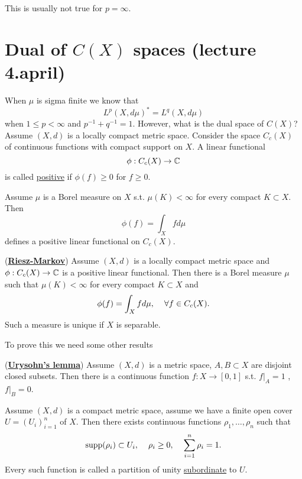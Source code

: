 \begin{remark}
    This is usually not true for $p=\infty$.
\end{remark}

\section*{Dual of $C(X)$ spaces (lecture 4.april)}
When $\mu$ is sigma finite we know that \[L^p(X,d\mu)^* = L^q(X,d\mu)\]
when $1\leq p<\infty$ and $p^{-1}+q^{-1}=1$. However, what is the dual space of $C(X)$?
Assume $(X,d)$ is a locally compact metric space. Consider the space $C_c(X)$ of continuous functions with compact support on $X$.
A linear functional 
\[\phi:C_c(X)\rightarrow \mathbb{C}\] is called \underline{positive} if $\phi(f)\geq 0$ for $f\geq 0$.
\begin{example}
    Assume $\mu$ is a Borel measure on $X$ s.t. $\mu(K)<\infty$ for every compact $K\subset X$. Then \[\phi(f)=\int_X fd\mu\] defines a positive linear functional on $C_c(X)$.
\end{example}

\begin{theorem}(\underline{\textbf{Riesz-Markov}})
    Assume $(X,d)$ is a locally compact metric space and $\phi:C_c(X)\rightarrow \mathbb{C}$ is a positive linear functional. Then there is a Borel measure $\mu$ such that $\mu(K)<\infty$ for every compact $K\subset X$ and 
    \[\phi(f)=\int_Xfd\mu,\hspace{4mm}\forall f\in C_c(X).\]
    Such a measure is unique if $X$ is separable.
\end{theorem}
To prove this we need some other results
\begin{lemma}(\underline{\textbf{Urysohn's lemma}})
    Assume $(X,d)$ is a metric space, $A,B\subset X$ are disjoint closed subsets. Then there is a continuous function 
    $f:X\rightarrow [0,1]$ s.t. $\left.f\right|_A=1$ , $\left.f\right|_B=0$. 
\end{lemma}

\begin{lemma}
    Assume $(X,d)$ is a compact metric space, assume we have a finite open cover $U=(U_i)_{i=1}^n$ of $X$. Then there exists
    continuous functions $\rho_1,\ldots,\rho_n$ such that \[\text{supp}(\rho_i)\subset U_i,\hspace{4mm} \rho_i\geq 0,\hspace{4mm} \sum_{i=1}^n \rho_i = 1.\]
    Every such function is called a partition of unity \underline{subordinate} to $U$.

\end{lemma}

